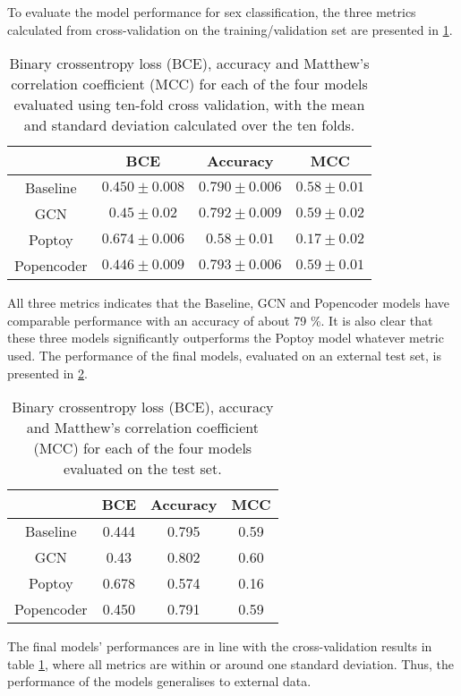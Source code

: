 To evaluate the model performance for sex classification, the three metrics calculated from cross-validation on the training/validation set are presented in \ref{tab:sex_model_results}.
\begin{table}[H]
    \centering
    \caption{Binary crossentropy loss (BCE), accuracy and Matthew's correlation coefficient (MCC) for each of the four models evaluated using ten-fold cross validation, with the mean and standard deviation calculated over the ten folds.}    
    \begin{tabular}{c|c|c|c}
         & BCE & Accuracy & MCC\\ \hline
        Baseline & $0.450\pm0.008$ & $0.790\pm0.006$ &$0.58\pm 0.01$\\
        GCN &$0.45\pm0.02$ & $0.792\pm0.009$& $0.59\pm0.02$\\
        Poptoy &$0.674\pm 0.006$ & $0.58\pm0.01$ &$0.17\pm0.02$\\
        Popencoder &$0.446\pm0.009$& $0.793\pm 0.006$ & $0.59\pm0.01$\\
    \end{tabular}
    \label{tab:sex_model_results}
\end{table}
All three metrics indicates that the Baseline, GCN and Popencoder models have comparable performance with an accuracy of about 79 \%. It is also clear that these three models significantly outperforms the Poptoy model whatever metric used. The performance of the final models, evaluated on an external test set, is presented in \ref{tab:sex_final_model_results}.
\begin{table}[H]
    \centering
    \caption{Binary crossentropy loss (BCE), accuracy and Matthew's correlation coefficient (MCC) for each of the four models evaluated on the test set.}
    \begin{tabular}{c|c|c|c}
         & BCE & Accuracy & MCC\\ \hline
        Baseline & 0.444 & 0.795 &0.59\\
        GCN & 0.43& 0.802 & 0.60 \\
        Poptoy &0.678 &0.574 &0.16\\
        Popencoder & 0.450 & 0.791& 0.59\\
    \end{tabular}
    \label{tab:sex_final_model_results}
\end{table}
The final models' performances are in line with the cross-validation results in table \ref{tab:sex_model_results}, where all metrics are within or around one standard deviation. Thus, the performance of the models generalises to external data.

